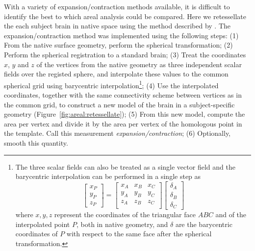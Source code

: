 With a variety of expansion/contraction methods available, it is difficult to identify the best to which areal analysis could be compared. Here we retessellate the each subject brain in native space using the method described by \citet{Saad2004}. The expansion/contraction method was implemented using the following steps: (1) From the native surface geometry, perform the spherical transformation; (2) Perform the spherical registration to a standard brain; (3) Treat the coordinates $x$, $y$ and $z$ of the vertices from the native geometry as three independent scalar fields over the registed sphere, and interpolate these values to the common spherical grid using barycentric interpolation\footnote{The three scalar fields can also be treated as a single vector field and the barycentric interpolation can be performed in a single step as
\begin{displaymath}
\left[
\begin{array}{c}
x_{P} \\
y_{P} \\
z_{P}
\end{array} \right] = \left[
\begin{array}{ccc}
x_{A} & x_{B} & x_{C} \\
y_{A} & y_{B} & y_{C} \\
z_{A} & z_{B} & z_{C} \\
\end{array}
\right] \left[
\begin{array}{c}
\delta_{A} \\
\delta_{B} \\
\delta_{C}
\end{array} \right]
\end{displaymath} where $x,y,z$ represent the coordinates of the triangular face $ABC$ and of the interpolated point $P$, both in native geometry, and $\delta$ are the barycentric coordinates of $P$ with respect to the same face after the spherical transformation.}; (4) Use the interpolated coordinates, together with the same connectivity scheme between vertices as in the common grid, to construct a new model of the brain in a subject-specific geometry (Figure~\ref{fig:areal:retessellate}); (5) From this new model, compute the area per vertex and divide it by the area per vertex of the homologous point in the template. Call this measurement \emph{expansion/contraction}; (6) Optionally, smooth this quantity.

